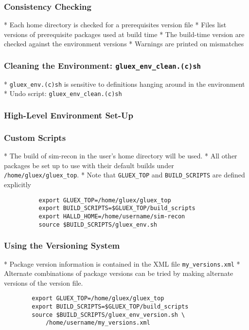 \documentclass[xcolor=dvipsnames,hyperref={pdfpagelabels=false}]{beamer}
\begin{document}
\begin{frame}
\end{frame}\begin{frame}\frametitle{Consistency Checking}

* Each home directory is checked for a prerequisites version file
* Files list versions of prerequisite packages used at build time
* The build-time version are checked against the environment versions
* Warnings are printed on mismatches

\end{frame}\begin{frame}\frametitle{Cleaning the Environment: {\tt gluex\_env\_clean.(c)sh}}

* {\tt gluex\_env.(c)sh} is sensitive to definitions hanging
around in the environment
* Undo script: {\tt gluex\_env\_clean.(c)sh}

\end{frame}\begin{frame}\frametitle{High-Level Environment Set-Up}

\end{frame}
\begin{frame}[fragile]
  \frametitle{Custom Scripts}\label{section:custom-scripts}

* The build of sim-recon in the user's home directory will be used.
* All other packages be set up to use with their default builds under {\tt
    /home/gluex/gluex\_top}.
* Note that {\tt GLUEX\_TOP} and {\tt BUILD\_SCRIPTS} are defined explicitly

\begin{verbatim}
          export GLUEX_TOP=/home/gluex/gluex_top
          export BUILD_SCRIPTS=$GLUEX_TOP/build_scripts
          export HALLD_HOME=/home/username/sim-recon
          source $BUILD_SCRIPTS/gluex_env.sh
\end{verbatim}

\end{frame}
\begin{frame}[fragile]
  \frametitle{Using the Versioning System}

* Package version information is contained in the XML file {\tt my\_versions.xml}
* Alternate combinations of package versions can be tried by making alternate versions of the version file.

\begin{verbatim}
        export GLUEX_TOP=/home/gluex/gluex_top
        export BUILD_SCRIPTS=$GLUEX_TOP/build_scripts
        source $BUILD_SCRIPTS/gluex_env_version.sh \
            /home/username/my_versions.xml
\end{verbatim}

\end{frame}
\end{document}
